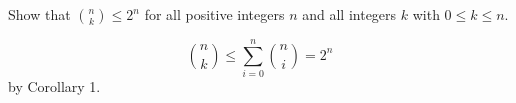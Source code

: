 \documentclass[../main.tex]{subfiles}
\begin{document}
Show that $\binom{n}{k} \leq 2^n$ for all positive integers $n$ and all integers $k$ with $0 \leq k \leq n$.

\solution
\[
	\binom{n}{k} \leq \sum_{i=0}^n\binom{n}{i} = 2^n
\]
by Corollary 1.
\end{document}
